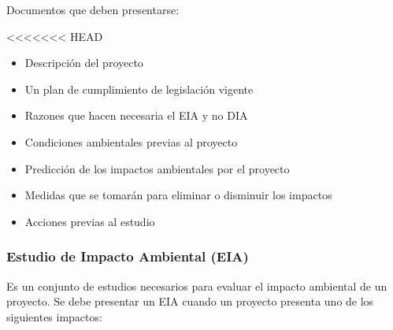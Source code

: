 \documentclass{article} %
\begin{document}
Documentos que deben presentarse:

<<<<<<< HEAD
\begin{itemize}[label={},left=0pt,align=parleft]
    \item \begin{highlightbox}[levelone] Descripción del proyecto \end{highlightbox}
    \item \begin{highlightbox}[levelone] Un plan de cumplimiento de legislación vigente \end{highlightbox}
    \item \begin{highlightbox}[levelone] Razones que hacen necesaria el EIA y no DIA \end{highlightbox}
    \item \begin{highlightbox}[levelone] Condiciones ambientales previas al proyecto \end{highlightbox}
    \item \begin{highlightbox}[levelone] Predicción de los impactos ambientales por el proyecto \end{highlightbox}
    \item \begin{highlightbox}[levelone] Medidas que se tomarán para eliminar o disminuir los impactos \end{highlightbox}
    \item \begin{highlightbox}[levelone] Acciones previas al estudio \end{highlightbox}
\end{itemize}

\subsubsection{Estudio de Impacto Ambiental (EIA)}

Es un conjunto de estudios necesarios para evaluar el impacto ambiental de un proyecto. Se debe presentar un EIA cuando un proyecto presenta uno de los siguientes impactos:
\end{document}
